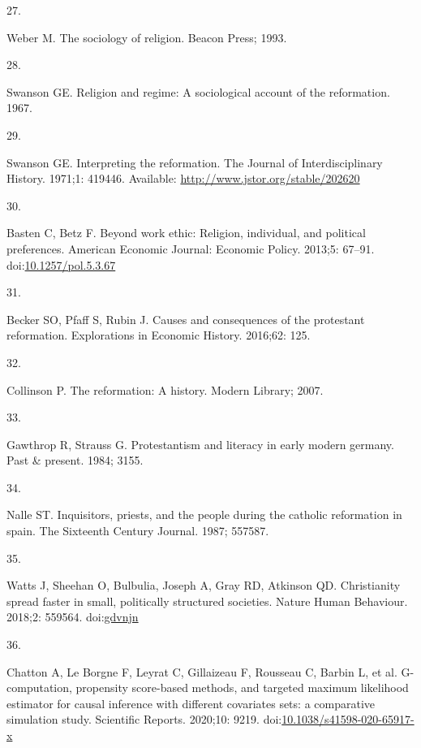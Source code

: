 \documentclass[
  singlecolumn]{article}
\newlength{\cslhangindent}
\newlength{\csllabelwidth}
\newlength{\cslentryspacingunit} %
\newenvironment{CSLReferences}[2] %
 {%
  \setlength{\parindent}{0pt}
  \ifodd #1
  \let\oldpar\par
  \def\par{\hangindent=\cslhangindent\oldpar}
  \fi
  \setlength{\parskip}{#2\cslentryspacingunit}
 }%
 {}
\newcommand{\CSLLeftMargin}[1]{\parbox[t]{\csllabelwidth}{#1}}
\newcommand{\CSLRightInline}[1]{\parbox[t]{\linewidth - \csllabelwidth}{#1}\break}
\begin{document}
\begin{CSLReferences}{0}{0}
\leavevmode{}%
\CSLLeftMargin{27. }%
\CSLRightInline{Weber M. The sociology of religion. Beacon Press; 1993.
}

\leavevmode{}%
\CSLLeftMargin{28. }%
\CSLRightInline{Swanson GE. Religion and regime: A sociological account
of the reformation. 1967. }

\leavevmode{}%
\CSLLeftMargin{29. }%
\CSLRightInline{Swanson GE. Interpreting the reformation. The Journal of
Interdisciplinary History. 1971;1: 419446. Available:
\url{http://www.jstor.org/stable/202620}}

\leavevmode{}%
\CSLLeftMargin{30. }%
\CSLRightInline{Basten C, Betz F. Beyond work ethic: Religion,
individual, and political preferences. American Economic Journal:
Economic Policy. 2013;5: 67--91.
doi:\href{https://doi.org/10.1257/pol.5.3.67}{10.1257/pol.5.3.67}}

\leavevmode{}%
\CSLLeftMargin{31. }%
\CSLRightInline{Becker SO, Pfaff S, Rubin J. Causes and consequences of
the protestant reformation. Explorations in Economic History. 2016;62:
125. }

\leavevmode{}%
\CSLLeftMargin{32. }%
\CSLRightInline{Collinson P. The reformation: A history. Modern Library;
2007. }

\leavevmode{}%
\CSLLeftMargin{33. }%
\CSLRightInline{Gawthrop R, Strauss G. Protestantism and literacy in
early modern germany. Past \& present. 1984; 3155. }

\leavevmode{}%
\CSLLeftMargin{34. }%
\CSLRightInline{Nalle ST. Inquisitors, priests, and the people during
the catholic reformation in spain. The Sixteenth Century Journal. 1987;
557587. }

\leavevmode{}%
\CSLLeftMargin{35. }%
\CSLRightInline{Watts J, Sheehan O, Bulbulia, Joseph A, Gray RD,
Atkinson QD. Christianity spread faster in small, politically structured
societies. Nature Human Behaviour. 2018;2: 559564.
doi:\href{https://doi.org/gdvnjn}{gdvnjn}}

\leavevmode{}%
\CSLLeftMargin{36. }%
\CSLRightInline{Chatton A, Le Borgne F, Leyrat C, Gillaizeau F, Rousseau
C, Barbin L, et al. G-computation, propensity score-based methods, and
targeted maximum likelihood estimator for causal inference with
different covariates sets: a comparative simulation study. Scientific
Reports. 2020;10: 9219.
doi:\href{https://doi.org/10.1038/s41598-020-65917-x}{10.1038/s41598-020-65917-x}}


\end{CSLReferences}
\end{document}
